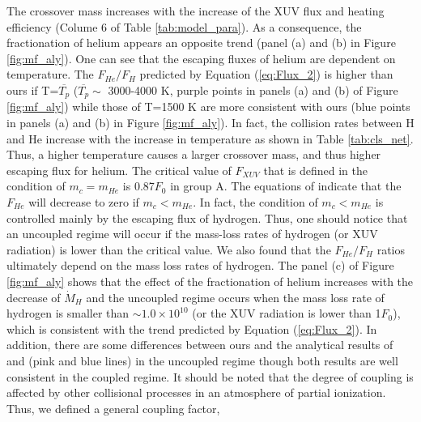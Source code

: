 \documentclass[journal, onecolumn]{aastex631}
\begin{document}
\begin{CJK*}{UTF8}{gbsn}
The crossover mass increases with the increase of the XUV flux and heating efficiency (Colume 6 of Table \ref{tab:model_para}). As a consequence, the fractionation of helium appears an opposite trend (panel (a) and (b) in Figure \ref{fig:mf_aly}). One can see that the escaping fluxes of helium are dependent on temperature. The $F_{He}/F_H$ predicted by Equation (\ref{eq:Flux_2}) is higher than ours if T=$\overline{T_{p}}$ ($\overline{T_{p}}\sim$ 3000-4000 K, purple points in panels (a) and (b) of Figure \ref{fig:mf_aly}) while those of T=1500 K are more consistent with ours (blue points in panels (a) and (b) in Figure \ref{fig:mf_aly}). In fact, the collision rates between H and He increase with the increase in temperature as shown in Table \ref{tab:cls_net}. Thus, a higher temperature causes a larger crossover mass, and thus higher escaping flux for helium. The critical value of $F_{XUV}$ that is defined in the condition of $m_c=m_{He}$ is 0.87$F_{0}$ in group A. The equations of \cite{Hunten1987} indicate that the $F_{He}$ will decrease to zero if $m_c<m_{He}$. In fact, the condition of $m_c<m_{He}$ is controlled mainly by the escaping flux of hydrogen. Thus, one should notice that an uncoupled regime will occur if the mass-loss rates of hydrogen (or XUV radiation) is lower than the critical value. We also found that the $F_{He}/F_{H}$ ratios ultimately depend on the mass loss rates of hydrogen. The panel (c) of Figure \ref{fig:mf_aly} shows that the effect of the fractionation of helium increases with the decrease of $\dot{M}_{H}$ and the uncoupled regime occurs when the mass loss rate of hydrogen is smaller than $\sim 1.0\times10^{10}$ (or the XUV radiation is lower than 1$F_{0}$), which is consistent with the trend predicted by Equation (\ref{eq:Flux_2}). In addition, there are some differences between ours and the analytical results of \cite{Zahnle1986} and \cite{Hunten1987} (pink and blue lines) in the uncoupled regime though both results are well consistent  in the coupled regime. It should be noted that the degree of coupling is affected by other collisional processes in an atmosphere of partial ionization. Thus, we defined a general coupling factor,


\end{CJK*}
\end{document}
